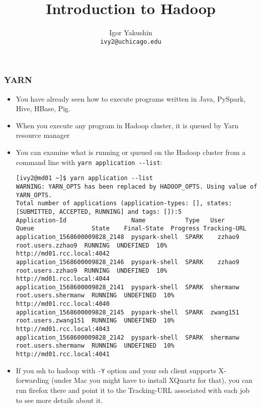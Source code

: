 \documentclass{beamer}
\title{\huge{Introduction to Hadoop}}
\author{Igor Yakushin \\ \texttt{ivy2@uchicago.edu}}
\begin{document}



\begin{frame}
\titlepage
\end{frame}


\begin{frame}[fragile]
  \frametitle{YARN}
  \begin{itemize}
  \item You have already seen how to execute programs written in Java, PySpark, Hive, HBase, Pig.
  \item When you execute any program in Hadoop cluster, it is queued by Yarn resource manager
  \item You can examine what is running or queued on the Hadoop cluster from a command line
    with {\color{mycolorcli}\verb|yarn application --list|}:
    {\fontsize{4}{6}

      {\color{mycolorcli}
\begin{verbatim}
[ivy2@md01 ~]$ yarn application --list
WARNING: YARN_OPTS has been replaced by HADOOP_OPTS. Using value of YARN_OPTS.
Total number of applications (application-types: [], states: [SUBMITTED, ACCEPTED, RUNNING] and tags: []):5
Application-Id                  Name           Type   User       Queue                State    Final-State  Progress Tracking-URL
application_1568600009828_2148  pyspark-shell  SPARK    zzhao9     root.users.zzhao9  RUNNING  UNDEFINED  10%  http://md01.rcc.local:4042
application_1568600009828_2146  pyspark-shell  SPARK    zzhao9     root.users.zzhao9  RUNNING  UNDEFINED  10%  http://md01.rcc.local:4044
application_1568600009828_2141  pyspark-shell  SPARK  shermanw   root.users.shermanw  RUNNING  UNDEFINED  10%  http://md01.rcc.local:4040
application_1568600009828_2145  pyspark-shell  SPARK  zwang151   root.users.zwang151  RUNNING  UNDEFINED  10%  http://md01.rcc.local:4043
application_1568600009828_2142  pyspark-shell  SPARK  shermanw   root.users.shermanw  RUNNING  UNDEFINED  10%  http://md01.rcc.local:4041
\end{verbatim}
      }
    }
  \item If you ssh to hadoop with \verb|-Y| option and your ssh client supports X-forwarding
    (under Mac you might have to install XQuartz for that),
    you can run firefox there and point it to the Tracking-URL associated with each job to see more details
    about it.
  \end{itemize}
\end{frame}
\end{document}
